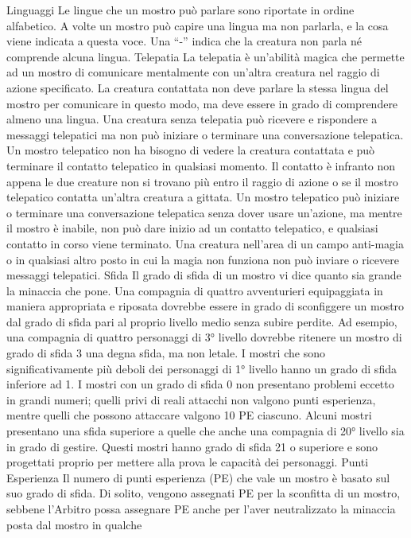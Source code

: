 \begin{multicols}{2}
Linguaggi
Le lingue che un mostro può parlare sono riportate in
ordine alfabetico. A volte un mostro può capire una
lingua ma non parlarla, e la cosa viene indicata a
questa voce. Una “-” indica che la creatura non parla né
comprende alcuna lingua.
Telepatia
La telepatia è un’abilità magica che permette ad un
mostro di comunicare mentalmente con un’altra
creatura nel raggio di azione specificato. La creatura
contattata non deve parlare la stessa lingua del mostro
per comunicare in questo modo, ma deve essere in
grado di comprendere almeno una lingua. Una creatura
senza telepatia può ricevere e rispondere a messaggi
telepatici ma non può iniziare o terminare una
conversazione telepatica.
Un mostro telepatico non ha bisogno di vedere la
creatura contattata e può terminare il contatto telepatico
in qualsiasi momento. Il contatto è infranto non appena
le due creature non si trovano più entro il raggio di
azione o se il mostro telepatico contatta un’altra
creatura a gittata. Un mostro telepatico può iniziare o
terminare una conversazione telepatica senza dover
usare un’azione, ma mentre il mostro è inabile, non può
dare inizio ad un contatto telepatico, e qualsiasi
contatto in corso viene terminato.
Una creatura nell’area di un campo anti-magia o in
qualsiasi altro posto in cui la magia non funziona non
può inviare o ricevere messaggi telepatici.
Sfida
Il grado di sfida di un mostro vi dice quanto sia grande
la minaccia che pone. Una compagnia di quattro
avventurieri equipaggiata in maniera appropriata e
riposata dovrebbe essere in grado di sconfiggere un
mostro dal grado di sfida pari al proprio livello medio
senza subire perdite. Ad esempio, una compagnia di
quattro personaggi di 3° livello dovrebbe ritenere un
mostro di grado di sfida 3 una degna sfida, ma non
letale.
I mostri che sono significativamente più deboli dei
personaggi di 1° livello hanno un grado di sfida inferiore
ad 1. I mostri con un grado di sfida 0 non presentano
problemi eccetto in grandi numeri; quelli privi di reali
attacchi non valgono punti esperienza, mentre quelli
che possono attaccare valgono 10 PE ciascuno.
Alcuni mostri presentano una sfida superiore a quelle
che anche una compagnia di 20° livello sia in grado di
gestire. Questi mostri hanno grado di sfida 21 o
superiore e sono progettati proprio per mettere alla
prova le capacità dei personaggi.
Punti Esperienza
Il numero di punti esperienza (PE) che vale un mostro è
basato sul suo grado di sfida. Di solito, vengono
assegnati PE per la sconfitta di un mostro, sebbene
l’Arbitro possa assegnare PE anche per l’aver
neutralizzato la minaccia posta dal mostro in qualche

\end{multicols}
